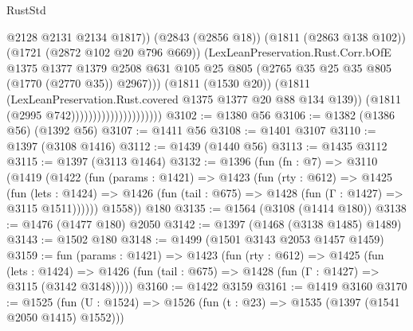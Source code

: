 \begin{lexlean}{RustStd}
\begin{coremodule}
                                                @2128
                                                @2131
                                                @2134
                                                @1817))
                                            (@2843 (@2856 @18))
                                            (@1811 (@2863 @138 @102))
                                            (@1721 (@2872 @102 @20 @796 @669))
                                            (LexLeanPreservation.Rust.Corr.bOfE
                                              @1375
                                              @1377
                                              @1379
                                              @2508
                                              @631
                                              @105
                                              @25
                                              @805
                                              (@2765 @35 @25 @35 @805 (@1770 (@2770 @35)) @2967)))
                                          (@1811 (@1530 @20))
                                          (@1811
                                            (LexLeanPreservation.Rust.covered
                                              @1375
                                              @1377
                                              @20
                                              @88
                                              @134
                                              @139))
                                          (@1811 (@2995 @742)))))))))))))))))))))
@3102 := @1380 @56
@3106 := @1382 (@1386 @56) (@1392 @56)
@3107 := @1411 @56
@3108 := @1401 @3107
@3110 := @1397 (@3108 @1416)
@3112 := @1439 (@1440 @56)
@3113 := @1435 @3112
@3115 := @1397 (@3113 @1464)
@3132 := @1396
    (fun (fn : @7) =>
    @3110
      (@1419
        (@1422
          (fun (params : @1421) =>
          @1423
            (fun (rty : @612) =>
            @1425
              (fun (lets : @1424) =>
              @1426 (fun (tail : @675) => @1428 (fun (Γ : @1427) => @3115 @1511))))))
        @1558))
    @180
@3135 := @1564 (@3108 (@1414 @180))
@3138 := @1476 (@1477 @180) @2050
@3142 := @1397 (@1468 (@3138 @1485) @1489)
@3143 := @1502 @180
@3148 := @1499 (@1501 @3143 @2053 @1457 @1459)
@3159 := fun (params : @1421) =>
  @1423
    (fun (rty : @612) =>
    @1425
      (fun (lets : @1424) =>
      @1426 (fun (tail : @675) => @1428 (fun (Γ : @1427) => @3115 (@3142 @3148)))))
@3160 := @1422 @3159
@3161 := @1419 @3160
@3170 := @1525 (fun (U : @1524) => @1526 (fun (t : @23) => @1535 (@1397 (@1541 @2050 @1415) @1552)))

\end{coremodule}
\end{lexlean}
